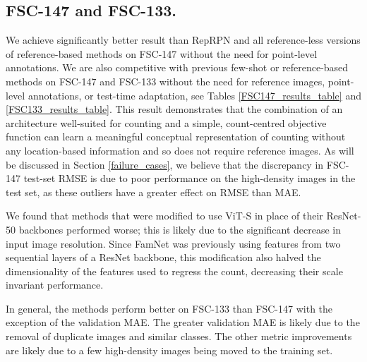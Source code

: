 \documentclass[letterpaper, 11pt]{IEEEtran}
\begin{document}
\subsection{FSC-147 and FSC-133.}
We achieve significantly better result than RepRPN and all reference-less versions of reference-based methods on FSC-147 without the need for point-level annotations. We are also competitive with previous few-shot or reference-based methods on FSC-147 and FSC-133 without the need for reference images, point-level annotations, or test-time adaptation, see Tables \ref{FSC147_results_table} and \ref{FSC133_results_table}. 
This result demonstrates that the combination of an architecture well-suited for counting and a simple, count-centred objective function can learn a meaningful conceptual representation of counting without any location-based information and so does not require reference images.
As will be discussed in Section \ref{failure_cases}, we believe that the discrepancy in FSC-147 test-set RMSE is due to  poor performance on the high-density images in the test set, as these outliers have a greater effect on RMSE than MAE.

We found that methods that were modified to use  ViT-S in place of their ResNet-50 backbones performed worse;
this is likely due to the significant decrease in input image resolution.
Since FamNet was previously using features from two sequential layers of a ResNet backbone, this modification also halved the dimensionality of the features used to regress the count, decreasing their scale invariant performance.

In general, the methods perform better on FSC-133 than FSC-147 with the exception of the validation MAE. The greater validation MAE is likely due to the removal of duplicate images and similar classes. The other metric improvements are likely due to a few high-density images being moved to the training set.
\begin{table}
    \centering
    \fontsize{9}{9}\selectfont
    
    \caption{\textbf{Comparison to state-of-the-art methods on FSC-147.} We outperform other reference-less methods and achieve competitive results with methods which use reference images and test-time adaptation. We highlight the best results for reference-based and reference-less methods. $\dag$ denotes methods trained using the same backbone as ours. 
    * indicates a reference-less modification of a reference-based method.
    }
    \label{FSC147_results_table}
\end{table}
\begin{table}
    \centering
    \fontsize{9}{9}\selectfont
    
    \caption{\textbf{Comparison to available state-of-the-art methods on FSC-133.}  We are competitive with reference-based methods without  reference images or test-time adaptation.
    $\dag$ denotes methods trained using the same backbone as ours.
    }
    \label{FSC133_results_table}
\end{table}
\end{document}
